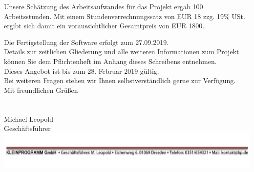 \documentclass[12pt]{article}
\begin{document}
Unsere Schätzung des Arbeitsaufwandes für das Projekt ergab 100 Arbeitsstunden. Mit einem Stundenverrechnungssatz von EUR 18 zzg. 19\% USt. ergibt sich damit ein voraussichtlicher Gesamtpreis von EUR 1800.

Die Fertigstellung der Software erfolgt zum 27.09.2019.\\
Details zur zeitlichen Gliederung und alle weiteren Informationen zum Projekt können Sie dem Pflichtenheft im Anhang dieses Schreibens entnehmen.\\

Dieses Angebot ist bis zum 28. Februar 2019 gültig.\\
Bei weiteren Fragen stehen wir Ihnen selbstverständlich gerne zur Verfügung.\\

Mit freundlichen Grüßen\\ \\ \\
Michael Leopold\\
Geschäftsführer\\

\vspace*{\fill}
\includegraphics[scale=0.9]{footer.pdf}
\thispagestyle{empty}
\end{document}
